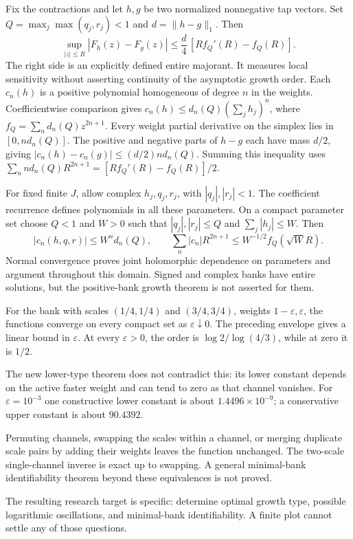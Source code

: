 Fix the contractions and let $h,g$ be two normalized nonnegative tap vectors.
Set $Q=\max_j\max(q_j,r_j)<1$ and $d=\|h-g\|_1$. Then
\[
\boxed{\sup_{|z|\le R}|F_h(z)-F_g(z)|
\le\frac{d}{4}\,[R f_Q'(R)-f_Q(R)].}
\]
The right side is an explicitly defined entire majorant. It measures local
sensitivity without asserting continuity of the asymptotic growth order.
Each $c_n(h)$ is a positive polynomial homogeneous of degree $n$ in the
weights. Coefficientwise comparison gives
$c_n(h)\le d_n(Q)(\sum_jh_j)^n$, where $f_Q=\sum_nd_n(Q)z^{2n+1}$.
Every weight partial derivative on the simplex lies in $[0,nd_n(Q)]$.
The positive and negative parts of $h-g$ each have mass $d/2$, giving
$|c_n(h)-c_n(g)|\le(d/2)nd_n(Q)$.
Summing this inequality uses
$\sum_nnd_n(Q)R^{2n+1}=[Rf_Q'(R)-f_Q(R)]/2$.

For fixed finite $J$, allow complex $h_j,q_j,r_j$, with
$|q_j|,|r_j|<1$. The coefficient recurrence defines polynomials in all these
parameters. On a compact parameter set choose $Q<1$ and $W>0$ such that
$|q_j|,|r_j|\le Q$ and $\sum_j|h_j|\le W$. Then
\[
|c_n(h,q,r)|\le W^n d_n(Q),
\qquad
\sum_n|c_n|R^{2n+1}\le W^{-1/2}f_Q(\sqrt W R).
\]
Normal convergence proves joint holomorphic dependence on parameters and
argument throughout this domain. Signed and complex banks have entire
solutions, but the positive-bank growth theorem is not asserted for them.

For the bank with scales $(1/4,1/4)$ and $(3/4,3/4)$, weights
$1-\varepsilon,\varepsilon$, the functions converge on every compact set
as $\varepsilon\downarrow0$. The preceding envelope gives a linear bound
in $\varepsilon$. At every $\varepsilon>0$, the order is
$\log2/\log(4/3)$, while at zero it is $1/2$.

The new lower-type theorem does not contradict this: its lower constant
depends on the active faster weight and can tend to zero as that channel
vanishes. For $\varepsilon=10^{-3}$ one constructive lower constant is
about $1.4496\times10^{-9}$; a conservative upper constant is about $90.4392$.

Permuting channels, swapping the scales within a channel, or merging
duplicate scale pairs by adding their weights leaves the function unchanged.
The two-scale single-channel inverse is exact up to swapping. A general
minimal-bank identifiability theorem beyond these equivalences is not proved.

The resulting research target is specific: determine optimal growth type,
possible logarithmic oscillations, and minimal-bank identifiability. A finite
plot cannot settle any of those questions.
